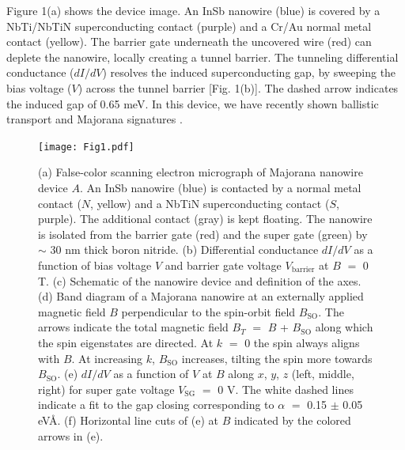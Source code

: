 Figure 1(a) shows the device image.
An InSb nanowire (blue) is covered by a NbTi/NbTiN superconducting contact (purple) and a Cr/Au normal metal contact (yellow).
The barrier gate underneath the uncovered wire (red) can deplete the nanowire, locally creating a tunnel barrier.
The tunneling differential conductance ($dI/dV$) resolves the induced superconducting gap, by sweeping the bias voltage ($V$) across the tunnel barrier [Fig. 1(b)].
The dashed arrow indicates the induced gap of 0.65 meV.
In this device, we have recently shown ballistic transport and Majorana signatures \cite{BalMaj}.
\begin{figure}
\texttt{[image: Fig1.pdf]}
\caption{\label{fig1}
(a) False-color scanning electron micrograph of Majorana nanowire device $A$.
An InSb nanowire (blue) is contacted by a normal metal contact ($N$, yellow) and a NbTiN superconducting contact ($S$, purple).
The additional contact (gray) is kept floating.
The nanowire is isolated from the barrier gate (red) and the super gate (green) by $\sim$ 30 nm thick boron nitride.
(b) Differential conductance $dI/dV$ as a function of bias voltage $V$ and barrier gate voltage $V_{\mathrm{barrier}}$ at $B$ $=$ 0 T.
(c) Schematic of the nanowire device and definition of the axes.
(d) Band diagram of a Majorana nanowire at an externally applied magnetic field $B$ perpendicular to the spin-orbit field $B_{\mathrm{SO}}$.
The arrows indicate the total magnetic field $B_T$ $=$ $B$ + $B_{\mathrm{SO}}$ along which the spin eigenstates are directed.
At $k$ $=$ 0 the spin always aligns with $B$.
At increasing $k$, $B_{\mathrm{SO}}$ increases, tilting the spin more towards $B_{\mathrm{SO}}$.
(e) $dI/dV$ as a function of $V$ at $B$ along $x$, $y$, $z$ (left, middle, right) for super gate voltage $V_{\mathrm{SG}}$ $=$ 0 V.
The white dashed lines indicate a fit to the gap closing corresponding to $\alpha$ $=$ 0.15 $\pm$ 0.05 eV\AA.
(f) Horizontal line cuts of (e) at $B$ indicated by the colored arrows in (e).
}
\end{figure}

